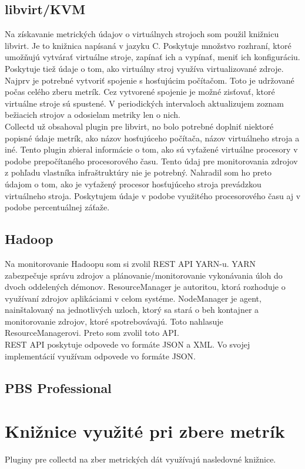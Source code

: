 \documentclass[12pt,twoside,color,cover,table]{fithesis3}
\begin{document}
\subsection{libvirt/KVM}
Na získavanie metrických údajov o virtuálnych strojoch som použil knižnicu libvirt. Je to knižnica napísaná v jazyku C. Poskytuje množstvo
rozhraní, ktoré umožňujú vytvárať virtuálne stroje, zapínať ich a vypínať, meniť ich konfiguráciu. Poskytuje tiež údaje o tom, ako virtuálny
stroj využíva virtualizované zdroje. 
\\Najprv je potrebné vytvoriť spojenie s hosťujúcim počítačom. Toto je udržované počas celého zberu metrík. Cez vytvorené spojenie
je možné zisťovať, ktoré virtuálne stroje sú spustené. V periodických intervaloch aktualizujem zoznam bežiacich strojov a odosielam
metriky len o nich.
\\Collectd už obsahoval plugin pre libvirt, no bolo potrebné doplniť niektoré popisné údaje metrík, ako názov hosťujúceho počítača,
názov virtuálneho stroja a iné. Tento plugin zbieral informácie o tom, ako sú vyťažené virtuálne procesory v podobe prepočítaného procesorového času.
Tento údaj pre monitorovania zdrojov z pohľadu vlastníka infraštruktúry nie je potrebný. Nahradil som ho preto údajom o tom, ako je vyťažený
procesor hosťujúceho stroja prevádzkou virtuálneho stroja. Poskytujem údaje v podobe využitého procesorového času aj v podobe percentuálnej záťaže.

\subsection{Hadoop}
Na monitorovanie Hadoopu som si zvolil REST API YARN-u. YARN zabezpečuje správu zdrojov a plánovanie/monitorovanie vykonávania úloh do dvoch
oddelených démonov.%
ResourceManager je autoritou, ktorá rozhoduje o využívaní zdrojov aplikáciami v celom systéme. NodeManager
je agent, nainštalovaný na jednotlivých uzloch, ktorý sa stará o beh kontajner a monitorovanie zdrojov, ktoré spotrebovávajú. Toto
nahlasuje ResourceManagerovi. Preto som zvolil toto API.
\\REST API poskytuje odpovede vo formáte JSON a XML. Vo svojej implementácií využívam odpovede vo formáte JSON.

\subsection{PBS Professional}

\section{Knižnice využité pri zbere metrík}
Pluginy pre collectd na zber metrických dát využívajú nasledovné knižnice. 
\end{document}
